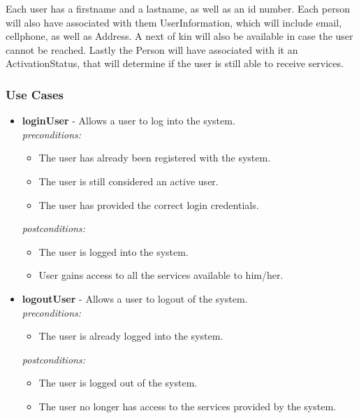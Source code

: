 \documentclass[a4paper,12pt]{article}
\begin{document}
	{\noindent}Each user has a firstname and a lastname, as well as an id number. Each person will also have associated with them UserInformation, which will include email, cellphone, as well as Address. A next of kin will also be available in case the user cannot be reached. Lastly the Person will have associated with it an ActivationStatus, that will determine if the user is still able to receive services.	
	 
	\newpage
	\subsubsection{Use Cases}
	
	\begin{itemize}
		\item \textbf{loginUser} - Allows a user to log into the system.\\[0.5cm]
		\textit{preconditions:}
			\begin{itemize}
				\item The user has already been registered with the system.
				\item The user is still considered an active user.
				\item The user has provided the correct login credentials.
			\end{itemize}
			
		\textit{postconditions:}
			\begin{itemize}
				\item The user is logged into the system.
				\item User gains access to all the services available to him/her.\\[0.5cm]
			\end{itemize}
			
		\item \textbf{logoutUser} - Allows a user to logout of the system.\\[0.5cm]
		\textit{preconditions:}
			\begin{itemize}
				\item The user is already logged into the system.
			\end{itemize}
		
		\textit{postconditions:}
			\begin{itemize}
				\item The user is logged out of the system.
				\item The user no longer has access to the services provided by the system.\\[0.5cm]
			\end{itemize}
			

\end{itemize}
\end{document}
